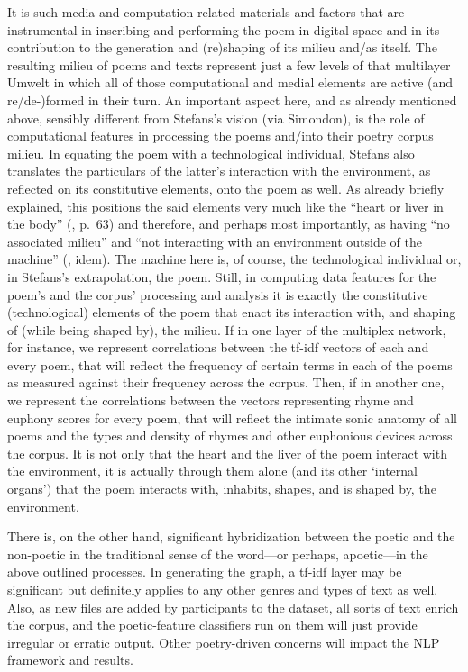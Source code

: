It is such media and computation-related materials and factors that are
instrumental in inscribing and performing the poem in digital space and
in its contribution to the generation and (re)shaping of its milieu
and/as itself. The resulting milieu of poems and texts represent just a
few levels of that multilayer Umwelt in which all of those computational
and medial elements are active (and re/de-)formed in their turn. An
important aspect here, and as already mentioned above, sensibly
different from Stefans's vision (via Simondon), is the role of
computational features in processing the poems and/into their poetry
corpus milieu. In equating the poem with a technological individual,
Stefans also translates the particulars of the latter's interaction with
the environment, as reflected on its constitutive elements, onto the
poem as well. As already briefly explained, this positions the said
elements very much like the ``heart or liver in the body''
(\cite{stefans2017word}, p.~63) and therefore, and perhaps most
importantly, as having ``no associated milieu'' and ``not
interact{ing} with an environment outside of the machine''
(\cite{stefans2017word}, idem). The machine here is, of course, the
technological individual or, in Stefans's extrapolation, the poem.
Still, in computing data features for the poem's and the corpus'
processing and analysis it is exactly the constitutive (technological)
elements of the poem that enact its interaction with, and shaping of
(while being shaped by), the milieu. If in one layer of the multiplex
network, for instance, we represent correlations between the tf-idf
vectors of each and every poem, that will reflect the frequency of
certain terms in each of the poems as measured against their frequency
across the corpus. Then, if in another one, we represent the
correlations between the vectors representing rhyme and euphony scores
for every poem, that will reflect the intimate sonic anatomy of all
poems and the types and density of rhymes and other euphonious devices
across the corpus. It is not only that the heart and the liver of the
poem interact with the environment, it is actually through them alone
(and its other `internal organs') that the poem interacts with,
inhabits, shapes, and is shaped by, the environment.

There is, on the other hand, significant hybridization between the
poetic and the non-poetic in the traditional sense of the word---or
perhaps, apoetic---in the above outlined processes. In generating the
graph, a tf-idf layer may be significant but definitely applies to any
other genres and types of text as well. Also, as new files are added by
participants to the dataset, all sorts of text enrich the corpus, and
the poetic-feature classifiers run on them will just provide irregular
or erratic output. Other poetry-driven concerns will impact the NLP
framework and results.

